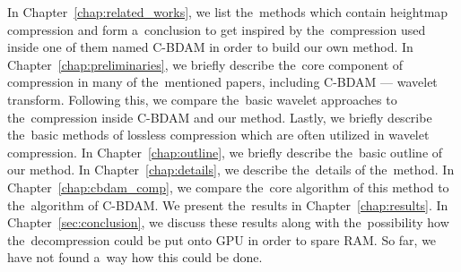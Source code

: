 In Chapter~\ref{chap:related_works}, we list the~methods which contain heightmap compression and form a~conclusion to get inspired by the~compression used inside one of them named C-BDAM in order to build our own method. In Chapter~\ref{chap:preliminaries}, we briefly describe the~core component of compression in many of the~mentioned papers, including C-BDAM --- wavelet transform. Following this, we compare the~basic wavelet approaches to the~compression inside C-BDAM and our method. Lastly, we briefly describe the~basic methods of lossless compression which are often utilized in wavelet compression. In Chapter~\ref{chap:outline}, we briefly describe the~basic outline of our method. In Chapter~\ref{chap:details}, we describe the~details of the~method. In Chapter~\ref{chap:cbdam_comp}, we compare the~core algorithm of this method to the~algorithm of C-BDAM. We present the~results in Chapter~\ref{chap:results}. In Chapter~\ref{sec:conclusion}, we discuss these results along with the~possibility how the~decompression could be put onto GPU in order to spare RAM. So far, we have not found a~way how this could be done.